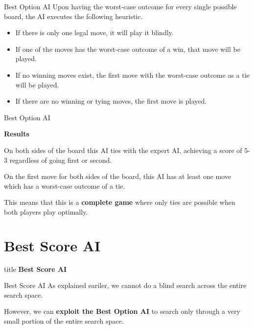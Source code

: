 \documentclass[11pt]{beamer}
\begin{document}
\begin{frame}{Best Option AI}
	Upon having the worst-case outcome for every single possible board, the AI
	executes the following heuristic.

	\bigskip

	\begin{itemize}
		\item If there is only one legal move, it will play it blindly.
		\item If one of the moves has the worst-case outcome of a win, that move will be played.
		\item If no winning moves exist, the first move with the worst-case outcome as a tie will be played.
		\item If there are no winning or tying moves, the first move is played.
	\end{itemize}
\end{frame}

\begin{frame}{Best Option AI}
	\begin{center}
		\huge \textbf{Results}
	\end{center}

	\bigskip

	On both sides of the board this AI ties with the expert AI, achieving a score of 5-3 regardless of
	going first or second.

	\bigskip

	On the first move for both sides of the board, this AI has at least one move which has a worst-case
	outcome of a tie.

	\bigskip

	This means that this is a \textbf{complete game} where only ties
	are possible when both players play optimally.
\end{frame}

\section{Best Score AI}

\begin{frame}
    \begin{beamercolorbox}[sep=8pt,center,rounded=true,shadow=true]{title}
		\Huge\textbf{Best Score AI}
    \end{beamercolorbox}
\end{frame}

\begin{frame}{Best Score AI}
	As explained eariler, we cannot do a blind search across the entire search space.

	\bigskip

	However, we can \textbf{exploit the Best Option AI} to search only through a very small
	portion of the entire search space.
\end{frame}
\end{document}
